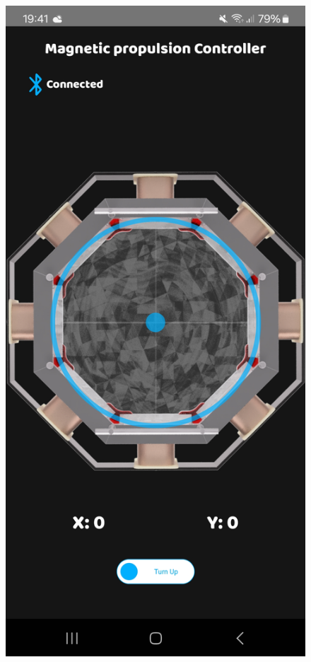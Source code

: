 \documentclass{article}
\begin{document}
        \begin{figure}[H]
    \centering
    \begin{minipage}{0.3\textwidth}
        \centering
        \includegraphics[width=\linewidth]{Images/app1 (3).jpg}


\end{minipage}
\end{figure}
\end{document}
